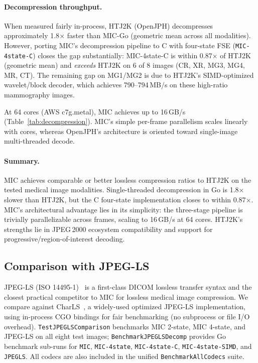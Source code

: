 \documentclass[11pt,twocolumn]{article}
\begin{document}
\paragraph{Decompression throughput.}
When measured fairly in-process, HTJ2K (OpenJPH) decompresses approximately 1.8$\times$ faster
than MIC-Go (geometric mean across all modalities).
However, porting MIC's decompression pipeline to C with four-state FSE (\texttt{MIC-4state-C})
closes the gap substantially: MIC-4state-C is within 0.87$\times$ of HTJ2K (geometric mean)
and \emph{exceeds} HTJ2K on 6 of 8 images (CR, XR, MG3, MG4, MR, CT).
The remaining gap on MG1/MG2 is due to HTJ2K's SIMD-optimized wavelet/block decoder, which
achieves 790--794\,MB/s on these high-ratio mammography images.

At 64 cores (AWS c7g.metal), MIC achieves up to 16\,GB/s (Table~\ref{tab:decompression}).
MIC's simple per-frame parallelism scales linearly with cores, whereas OpenJPH's
architecture is oriented toward single-image multi-threaded decode.

\paragraph{Summary.}
MIC achieves comparable or better lossless compression ratios to HTJ2K on the tested
medical image modalities.
Single-threaded decompression in Go is 1.8$\times$ slower than HTJ2K, but the C four-state
implementation closes to within 0.87$\times$.
MIC's architectural advantage lies in its simplicity: the three-stage pipeline is trivially
parallelizable across frames, scaling to 16\,GB/s at 64 cores.
HTJ2K's strengths lie in JPEG\,2000 ecosystem compatibility and support for
progressive/region-of-interest decoding.

\subsection{Comparison with JPEG-LS}
\label{sec:jpegls}

JPEG-LS (ISO 14495-1)~\cite{jpegls} is a first-class DICOM lossless transfer syntax and
the closest practical competitor to MIC for lossless medical image compression.
We compare against CharLS~\cite{charls}, a widely-used optimized JPEG-LS implementation,
using in-process CGO bindings for fair benchmarking (no subprocess or file I/O overhead).
\texttt{TestJPEGLSComparison} benchmarks MIC 2-state, MIC 4-state, and JPEG-LS on all
eight test images; \texttt{BenchmarkJPEGLSDecomp} provides Go benchmark sub-runs for
\texttt{MIC}, \texttt{MIC-4state}, \texttt{MIC-4state-C}, \texttt{MIC-4state-SIMD}, and
\texttt{JPEGLS}. All codecs are also included in the unified \texttt{BenchmarkAllCodecs} suite.
\end{document}
